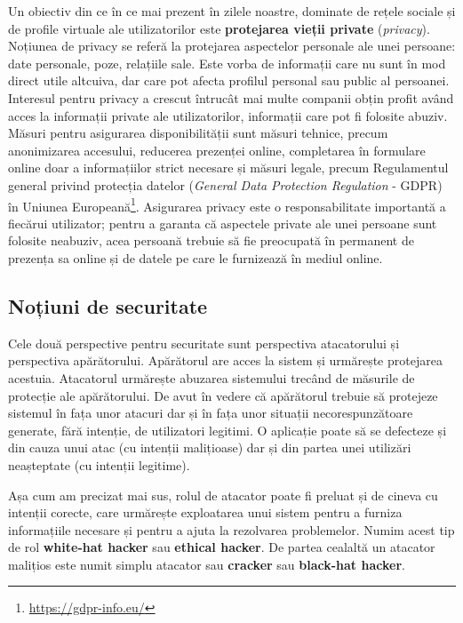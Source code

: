 Un obiectiv din ce în ce mai prezent în zilele noastre, dominate de rețele sociale și de profile virtuale ale utilizatorilor este \textbf{protejarea vieții private} (\textit{privacy}). Noțiunea de privacy se referă la protejarea aspectelor personale ale unei persoane: date personale, poze, relațiile sale. Este vorba de informații care nu sunt în mod direct utile altcuiva, dar care pot afecta profilul personal sau public al persoanei. Interesul pentru privacy a crescut întrucât mai multe companii obțin profit având acces la informații private ale utilizatorilor, informații care pot fi folosite abuziv. Măsuri pentru asigurarea disponibilității sunt măsuri tehnice, precum anonimizarea accesului, reducerea prezenței online, completarea în formulare online doar a informațiilor strict necesare și măsuri legale, precum Regulamentul general privind protecția datelor (\textit{General Data Protection Regulation} - GDPR) în Uniunea Europeană\footnote{\url{https://gdpr-info.eu/}}. Asigurarea privacy este o responsabilitate importantă a fiecărui utilizator; pentru a garanta că aspectele private ale unei persoane sunt folosite neabuziv, acea persoană trebuie să fie preocupată în permanent de prezența sa online și de datele pe care le furnizează în mediul online.

\subsection{Noțiuni de securitate}
\label{sec:sec:fundamentals:notions}

Cele două perspective pentru securitate sunt perspectiva atacatorului și perspectiva apărătorului. Apărătorul are acces la sistem și urmărește protejarea acestuia. Atacatorul urmărește abuzarea sistemului trecând de măsurile de protecție ale apărătorului. De avut în vedere că apărătorul trebuie să protejeze sistemul în fața unor atacuri dar și în fața unor situații necorespunzătoare generate, fără intenție, de utilizatori legitimi. O aplicație poate să se defecteze și din cauza unui atac (cu intenții malițioase) dar și din partea unei utilizări neașteptate (cu intenții legitime).

Așa cum am precizat mai sus, rolul de atacator poate fi preluat și de cineva cu intenții corecte, care urmărește exploatarea unui sistem pentru a furniza informațiile necesare și pentru a ajuta la rezolvarea problemelor. Numim acest tip de rol \textbf{white-hat hacker} sau \textbf{ethical hacker}. De partea cealaltă un atacator malițios este numit simplu atacator sau \textbf{cracker} sau \textbf{black-hat hacker}.

